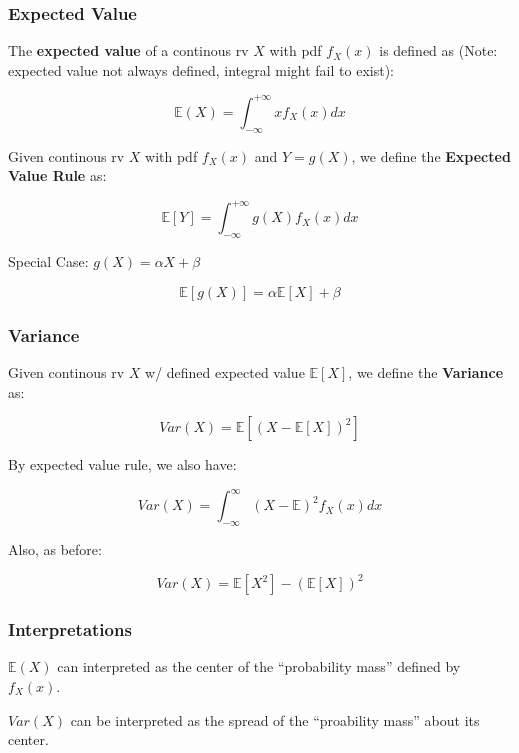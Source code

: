 \documentclass{article}
\begin{document}
\subsubsection{Expected Value}

The \textbf{expected value} of a continous rv $X$ with pdf $f_X(x)$ is
defined as (Note: expected value not always defined, integral might
fail to exist):

\begin{equation}
  \tag{Expected Value: Continous rv}
  \boxed{
    \mathbb{E}(X) = \int_{-\infty}^{+\infty} xf_X(x)dx
  }
\end{equation}

Given continous rv $X$ with pdf $f_X(x)$ and $Y=g(X)$, we define the
\textbf{Expected Value Rule} as:

\begin{equation}
  \tag{Expected Value Rule}
  \boxed{
    \mathbb{E}[Y] = \int_{-\infty}^{+\infty} g(X) f_X(x) dx
  }
\end{equation}

Special Case: $g(X) = \alpha X + \beta$

\[
  \mathbb{E}[g(X)] = \alpha \mathbb{E}[X] + \beta
\]

\subsubsection{Variance}

Given continous rv $X$ w/ defined expected value $\mathbb{E}[X]$, we
define the \textbf{Variance} as:

\begin{equation}
  \tag{Variance: Continous rv}
  \boxed{
    Var(X) = \mathbb{E}[(X - \mathbb{E}[X])^2]
  }
\end{equation}

By expected value rule, we also have:

\[
  Var(X) = \int_{-\infty}^\infty (X - \mathbb{E})^2 f_X(x) dx
\]

Also, as before:

\[
  Var(X) = \mathbb{E}[X^2] - (\mathbb{E}[X])^2
\]

\subsubsection{Interpretations}

$\mathbb{E}(X)$ can interpreted as the center of the ``probability
mass'' defined by $f_X(x)$.

$Var(X)$ can be interpreted as the spread of the ``proability mass''
about its center.
\end{document}
